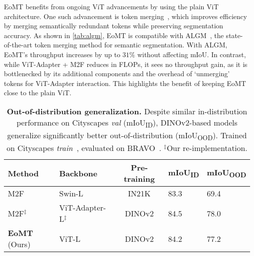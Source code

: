 \documentclass[10pt,twocolumn,letterpaper]{article}
\newcommand{\PAR}[1]{\vskip4pt \noindent {\bf #1~}}
\begin{document}
\PAR{Token merging.}
EoMT benefits from ongoing ViT advancements by using the plain ViT architecture. One such advancement is token merging~\cite{bolya2023tome,norouzi2024algm,lu2023cts}, which improves efficiency by merging semantically redundant tokens while preserving segmentation accuracy. As shown in \cref{tab:algm}, EoMT is compatible with ALGM~\cite{norouzi2024algm}, the state-of-the-art token merging method for semantic segmentation. With ALGM, EoMT’s throughput increases by up to $31\%$ without affecting mIoU. In contrast, while ViT-Adapter + M2F reduces in FLOPs, it sees no throughput gain, as it is bottlenecked by its additional components and the overhead of ‘unmerging’ tokens for ViT-Adapter interaction. This highlights the benefit of keeping EoMT close to the plain ViT.

\begin{table}
    \centering
    \footnotesize
    \setlength{\tabcolsep}{2.0pt}
    \begin{tabularx}{\linewidth}{
    llcYY
    }
    \toprule

    Method & Backbone & Pre-training & mIoU\textsubscript{ID} & mIoU\textsubscript{OOD} \\

    \midrule

    M2F~\cite{cheng2022mask2former} &
    Swin-L~\cite{liu2021swin} &
    IN21K &
    83.3 &
    69.4 \\

    M2F$^\ddagger$~\cite{cheng2022mask2former} &
    ViT-Adapter-L$^\ddagger$~\cite{chen2023vitadapter} &
    DINOv2 &
    84.5 &
    78.0 \\

    \textbf{EoMT} (Ours) &
    ViT-L~\cite{dosovitskiy2021vit} &
    DINOv2 &
    84.2 &
    77.2 \\

    \bottomrule
    
    \end{tabularx}
    \caption{\textbf{Out-of-distribution generalization.} Despite similar in-distribution performance on Cityscapes \textit{val} (mIoU\textsubscript{ID}), DINOv2-based models generalize significantly better out-of-distribution (mIoU\textsubscript{OOD}). Trained on Cityscapes \textit{train}~\cite{cordts2016cityscapes}, evaluated on BRAVO~\cite{vu2024bravo}. $^\ddagger$Our re-implementation. 
    }
    \label{tab:ood}
\end{table}
 
\end{document}
